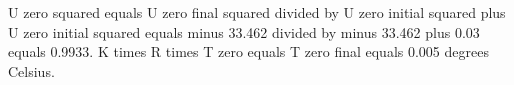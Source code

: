 U zero squared equals U zero final squared divided by U zero initial squared plus U zero initial squared equals minus 33.462 divided by minus 33.462 plus 0.03 equals 0.9933.  
K times R times T zero equals T zero final equals 0.005 degrees Celsius.